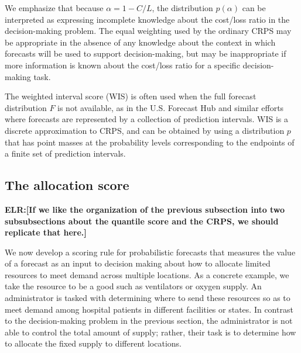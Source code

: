 \documentclass{article}
\def\elr#1{{\color{cyan}\textbf{ELR:[#1]}}}
\def\apg#1{{\color{red}\textbf{APG:[#1]}}}
\begin{document}
We emphasize that because $\alpha = 1 - C/L$, the distribution $p(\alpha)$ can be interpreted as expressing incomplete knowledge about the cost/loss ratio in the decision-making problem. The equal weighting used by the ordinary CRPS may be appropriate in the absence of any knowledge about the context in which forecasts will be used to support decision-making, but may be inappropriate if more information is known about the cost/loss ratio for a specific decision-making task.

The weighted interval score (WIS) is often used when the full forecast distribution $F$ is not available, as in the U.S. Forecast Hub and similar efforts where forecasts are represented by a collection of prediction intervals. WIS is a discrete approximation to CRPS, and can be obtained by using a distribution $p$ that has point masses at the probability levels corresponding to the endpoints of a finite set of prediction intervals.


\subsection{The allocation score}
\label{sec:methods.allocation}

\elr{If we like the organization of the previous subsection into two subsubsections about the quantile score and the CRPS, we should replicate that here.}

We now develop a scoring rule for probabilistic forecasts that measures the value of a forecast as an input to decision making about how to allocate limited resources to meet demand across multiple locations. As a concrete example, we take the resource to be a good such as ventilators or oxygen supply. An administrator is tasked with determining where to send these resources so as to meet demand among hospital patients in different facilities or states. In contrast to the decision-making problem in the previous section, the administrator is not able to control the total amount of supply; rather, their task is to determine how to allocate the fixed supply to different locations.
\end{document}
